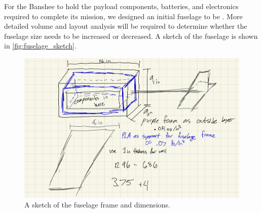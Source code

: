 For the Banshee to hold the payload components, batteries, and electronics required to complete its mission, we designed an initial fuselage to be . More detailed volume and layout analysis will be required to determine whether the fuselage size needs to be increased or decreased. A sketch of the fuselage is shown in \autoref{fig:fuselage_sketch}.

\begin{figure}[htpb]
    \centering
    \includegraphics[width=\linewidth]{Figures/fuselage_sketch.png}
    \caption[Fuselage sketch]{A sketch of the fuselage frame and dimensions.}
    \label{fig:fuselage_sketch}
\end{figure}
